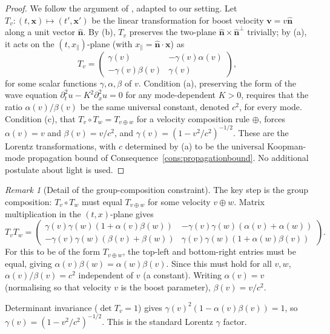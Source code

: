 \documentclass[11pt,twocolumn,a4paper]{article}
\theoremstyle{axiomstyle}
\theoremstyle{conseqstyle}
\theoremstyle{definition}
\theoremstyle{remark}
\newtheorem*{remark}{Remark}
\begin{document}
\begin{proof}
We follow the argument of \citet{ignatowsky1910}, adapted to our setting. Let $T_{v}\colon(t,\mathbf{x})\mapsto(t',\mathbf{x}')$ be the linear transformation for boost velocity $\mathbf{v}=v\hat{\mathbf{n}}$ along a unit vector $\hat{\mathbf{n}}$. By (b), $T_{v}$ preserves the two-plane $\hat{\mathbf{n}}\times\hat{\mathbf{n}}^{\perp}$ trivially; by (a), it acts on the $(t,x_{\|})$-plane (with $x_{\|}=\hat{\mathbf{n}}\cdot\mathbf{x}$) as
\begin{equation*}
T_{v}=\begin{pmatrix}\gamma(v)&-\gamma(v)\alpha(v)\\-\gamma(v)\beta(v)&\gamma(v)\end{pmatrix},
\end{equation*}
for some scalar functions $\gamma,\alpha,\beta$ of $v$. Condition (a), preserving the form of the wave equation $\partial_{t}^{2}u-K^{2}\partial_{x}^{2}u=0$ for any mode-dependent $K>0$, requires that the ratio $\alpha(v)/\beta(v)$ be the same universal constant, denoted $c^{2}$, for every mode. Condition (c), that $T_{v}\circ T_{w}=T_{v\oplus w}$ for a velocity composition rule $\oplus$, forces $\alpha(v)=v$ and $\beta(v)=v/c^{2}$, and $\gamma(v)=(1-v^{2}/c^{2})^{-1/2}$. These are the Lorentz transformations, with $c$ determined by (a) to be the universal Koopman-mode propagation bound of Consequence~\ref{cons:propagationbound}. No additional postulate about light is used.
\end{proof}

\begin{remark}[Detail of the group-composition constraint]
The key step is the group composition: $T_{v}\circ T_{w}$ must equal $T_{v\oplus w}$ for some velocity $v\oplus w$. Matrix multiplication in the $(t,x)$-plane gives
\begin{equation*}
T_{v}T_{w}=\begin{pmatrix}\gamma(v)\gamma(w)(1+\alpha(v)\beta(w))&-\gamma(v)\gamma(w)(\alpha(v)+\alpha(w))\\-\gamma(v)\gamma(w)(\beta(v)+\beta(w))&\gamma(v)\gamma(w)(1+\alpha(w)\beta(v))\end{pmatrix}.
\end{equation*}
For this to be of the form $T_{v\oplus w}$, the top-left and bottom-right entries must be equal, giving $\alpha(v)\beta(w)=\alpha(w)\beta(v)$. Since this must hold for all $v,w$, $\alpha(v)/\beta(v)=c^{2}$ independent of $v$ (a constant). Writing $\alpha(v)=v$ (normalising so that velocity $v$ is the boost parameter), $\beta(v)=v/c^{2}$.

Determinant invariance ($\det T_{v}=1$) gives $\gamma(v)^{2}(1-\alpha(v)\beta(v))=1$, so $\gamma(v)=(1-v^{2}/c^{2})^{-1/2}$. This is the standard Lorentz $\gamma$ factor.
\end{remark}
\end{document}
